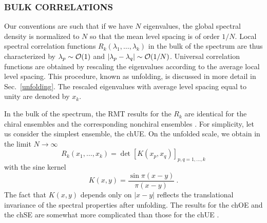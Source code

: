 \subsubsection{BULK CORRELATIONS}

Our conventions are such that if we have $N$ eigenvalues, the global
spectral density is normalized to $N$ so that the mean level spacing
is of order $1/N$.  Local spectral correlation functions
$R_k(\lambda_1,\ldots,\lambda_k)$ in the bulk of the spectrum are thus
characterized by $\lambda_p\sim{\cal O}(1)$ and
$|\lambda_p-\lambda_q|\sim{\cal O}(1/N)$.  Universal correlation
functions are obtained by rescaling the eigenvalues according to the
average local level spacing. This procedure, known as
unfolding, is discussed in more detail in Sec.~\ref{unfolding}.
The rescaled eigenvalues with average level spacing equal to unity are
denoted by $x_k$.

In the bulk of the spectrum, the RMT results for the
$R_k$ are identical for the chiral ensembles and the corresponding
nonchiral ensembles \cite{Fox64,nagao}.  For simplicity, let us
consider the simplest ensemble, the chUE.  On the unfolded scale, we
obtain in the limit $N\to\infty$
\begin{equation}
  \label{det}
  R_k(x_1,\ldots,x_k)=\det[K(x_p,x_q)]_{p,q=1,\ldots,k}
\end{equation}
with the sine kernel
\begin{equation}
  K(x,y)=\frac{\sin\pi(x-y)}{\pi(x-y)}\:.
\end{equation}
The fact that $K(x,y)$ depends only on $|x-y|$ reflects the
translational invariance of the spectral properties after unfolding.
The results for the chOE and the chSE are somewhat more complicated
than those for the chUE \cite{Mehta}.

